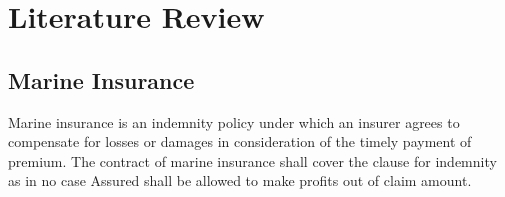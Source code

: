 \setlength{\footskip}{8mm}

\chapter{Literature Review} 
\label{ch:literature-review}



\section{Marine Insurance}

Marine insurance is an indemnity policy under which an insurer agrees to compensate for losses or damages in consideration of the timely payment of premium. The contract of marine insurance shall cover the clause for indemnity as in no case Assured shall be allowed to make profits out of claim amount. \cite{marineInsuranceAct55} 




